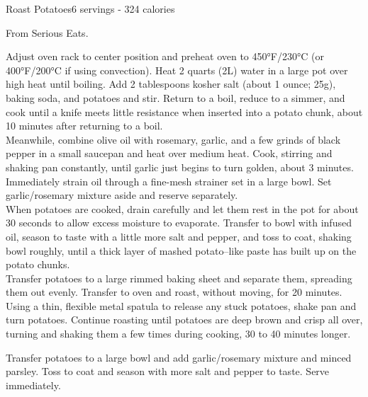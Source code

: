 \begin{recipe}{Roast Potatoes}{6 servings - 324 calories}{}

\freeform From Serious Eats.


Adjust oven rack to center position and preheat oven to 450°F/230°C (or 400°F/200°C if using convection). Heat 2 quarts (2L) water in a large pot over high heat until boiling. Add 2 tablespoons kosher salt (about 1 ounce; 25g), baking soda, and potatoes and stir. Return to a boil, reduce to a simmer, and cook until a knife meets little resistance when inserted into a potato chunk, about 10 minutes after returning to a boil.\\

Meanwhile, combine olive oil with rosemary, garlic, and a few grinds of black pepper in a small saucepan and heat over medium heat. Cook, stirring and shaking pan constantly, until garlic just begins to turn golden, about 3 minutes. Immediately strain oil through a fine-mesh strainer set in a large bowl. Set garlic/rosemary mixture aside and reserve separately.\\

When potatoes are cooked, drain carefully and let them rest in the pot for about 30 seconds to allow excess moisture to evaporate. Transfer to bowl with infused oil, season to taste with a little more salt and pepper, and toss to coat, shaking bowl roughly, until a thick layer of mashed potato–like paste has built up on the potato chunks.\\

Transfer potatoes to a large rimmed baking sheet and separate them, spreading them out evenly. Transfer to oven and roast, without moving, for 20 minutes. Using a thin, flexible metal spatula to release any stuck potatoes, shake pan and turn potatoes. Continue roasting until potatoes are deep brown and crisp all over, turning and shaking them a few times during cooking, 30 to 40 minutes longer.\newpage

Transfer potatoes to a large bowl and add garlic/rosemary mixture and minced parsley. Toss to coat and season with more salt and pepper to taste. Serve immediately.

\end{recipe}